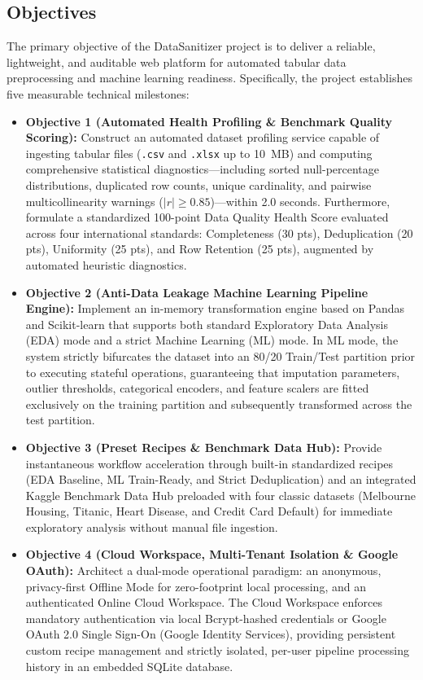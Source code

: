 \subsection{Objectives}
The primary objective of the DataSanitizer project is to deliver a reliable, lightweight, and auditable web platform for automated tabular data preprocessing and machine learning readiness. Specifically, the project establishes five measurable technical milestones:
\begin{itemize}
  \item \textbf{Objective 1 (Automated Health Profiling \& Benchmark Quality Scoring):} Construct an automated dataset profiling service capable of ingesting tabular files (\texttt{.csv} and \texttt{.xlsx} up to 10~MB) and computing comprehensive statistical diagnostics—including sorted null-percentage distributions, duplicated row counts, unique cardinality, and pairwise multicollinearity warnings ($|r| \ge 0.85$)—within 2.0 seconds. Furthermore, formulate a standardized 100-point Data Quality Health Score evaluated across four international standards: Completeness (30 pts), Deduplication (20 pts), Uniformity (25 pts), and Row Retention (25 pts), augmented by automated heuristic diagnostics.
  \item \textbf{Objective 2 (Anti-Data Leakage Machine Learning Pipeline Engine):} Implement an in-memory transformation engine based on Pandas \cite{mckinney2010} and Scikit-learn \cite{pedregosa2011} that supports both standard Exploratory Data Analysis (EDA) mode and a strict Machine Learning (ML) mode. In ML mode, the system strictly bifurcates the dataset into an 80/20 Train/Test partition prior to executing stateful operations, guaranteeing that imputation parameters, outlier thresholds, categorical encoders, and feature scalers are fitted exclusively on the training partition and subsequently transformed across the test partition.
  \item \textbf{Objective 3 (Preset Recipes \& Benchmark Data Hub):} Provide instantaneous workflow acceleration through built-in standardized recipes (EDA Baseline, ML Train-Ready, and Strict Deduplication) and an integrated Kaggle Benchmark Data Hub preloaded with four classic datasets (Melbourne Housing, Titanic, Heart Disease, and Credit Card Default) for immediate exploratory analysis without manual file ingestion.
  \item \textbf{Objective 4 (Cloud Workspace, Multi-Tenant Isolation \& Google OAuth):} Architect a dual-mode operational paradigm: an anonymous, privacy-first Offline Mode for zero-footprint local processing, and an authenticated Online Cloud Workspace. The Cloud Workspace enforces mandatory authentication via local Bcrypt-hashed credentials or Google OAuth 2.0 Single Sign-On (Google Identity Services), providing persistent custom recipe management and strictly isolated, per-user pipeline processing history in an embedded SQLite database.

\end{itemize}
